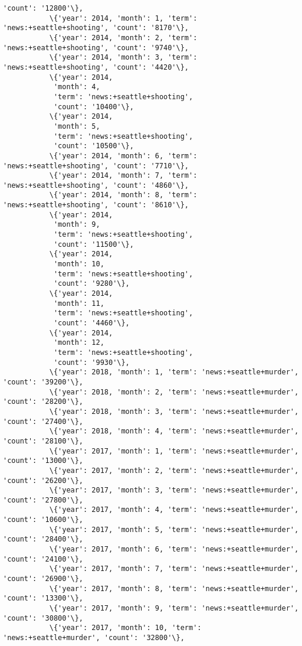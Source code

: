\documentclass[11pt]{article}
\begin{document}
\begin{Verbatim}[commandchars=\\\{\}]
            'count': '12800'\},
           \{'year': 2014, 'month': 1, 'term': 'news:+seattle+shooting', 'count': '8170'\},
           \{'year': 2014, 'month': 2, 'term': 'news:+seattle+shooting', 'count': '9740'\},
           \{'year': 2014, 'month': 3, 'term': 'news:+seattle+shooting', 'count': '4420'\},
           \{'year': 2014,
            'month': 4,
            'term': 'news:+seattle+shooting',
            'count': '10400'\},
           \{'year': 2014,
            'month': 5,
            'term': 'news:+seattle+shooting',
            'count': '10500'\},
           \{'year': 2014, 'month': 6, 'term': 'news:+seattle+shooting', 'count': '7710'\},
           \{'year': 2014, 'month': 7, 'term': 'news:+seattle+shooting', 'count': '4860'\},
           \{'year': 2014, 'month': 8, 'term': 'news:+seattle+shooting', 'count': '8610'\},
           \{'year': 2014,
            'month': 9,
            'term': 'news:+seattle+shooting',
            'count': '11500'\},
           \{'year': 2014,
            'month': 10,
            'term': 'news:+seattle+shooting',
            'count': '9280'\},
           \{'year': 2014,
            'month': 11,
            'term': 'news:+seattle+shooting',
            'count': '4460'\},
           \{'year': 2014,
            'month': 12,
            'term': 'news:+seattle+shooting',
            'count': '9930'\},
           \{'year': 2018, 'month': 1, 'term': 'news:+seattle+murder', 'count': '39200'\},
           \{'year': 2018, 'month': 2, 'term': 'news:+seattle+murder', 'count': '28200'\},
           \{'year': 2018, 'month': 3, 'term': 'news:+seattle+murder', 'count': '27400'\},
           \{'year': 2018, 'month': 4, 'term': 'news:+seattle+murder', 'count': '28100'\},
           \{'year': 2017, 'month': 1, 'term': 'news:+seattle+murder', 'count': '13000'\},
           \{'year': 2017, 'month': 2, 'term': 'news:+seattle+murder', 'count': '26200'\},
           \{'year': 2017, 'month': 3, 'term': 'news:+seattle+murder', 'count': '27800'\},
           \{'year': 2017, 'month': 4, 'term': 'news:+seattle+murder', 'count': '10600'\},
           \{'year': 2017, 'month': 5, 'term': 'news:+seattle+murder', 'count': '28400'\},
           \{'year': 2017, 'month': 6, 'term': 'news:+seattle+murder', 'count': '24100'\},
           \{'year': 2017, 'month': 7, 'term': 'news:+seattle+murder', 'count': '26900'\},
           \{'year': 2017, 'month': 8, 'term': 'news:+seattle+murder', 'count': '13300'\},
           \{'year': 2017, 'month': 9, 'term': 'news:+seattle+murder', 'count': '30800'\},
           \{'year': 2017, 'month': 10, 'term': 'news:+seattle+murder', 'count': '32800'\},

\end{Verbatim}
\end{document}
